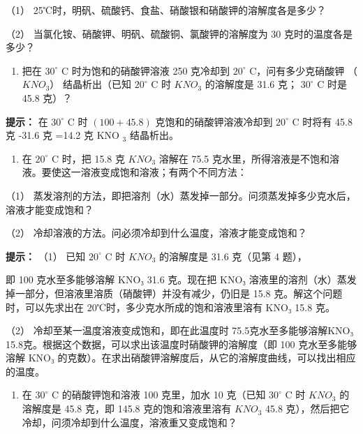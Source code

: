 （1） 25℃时，明矾、硫酸钙、食盐、硝酸银和硝酸钾的溶解度各是多少？

（2） 当氯化铵、硝酸钾、明矾、硫酸铜、氯酸钾的溶解度为 30
克时的温度各是多少？

\begin{enumerate}[start=4]
\item
  把在 \(30^{\circ}\) C 时为饱和的硝酸钾溶液 250 克冷却到 \(20^{\circ}\)
  C，问有多少克硝酸钾 （\(KNO_{3}\)） 结晶析出（已知 \(20^{\circ}\) C 时
  \(KNO_{3}\) 的溶解度是 31.6 克； \(30^{\circ}\) C 时是 45.8 克）？
\end{enumerate}

\begin{shulihuadef}
\textbf{提示：} 在 \(30^{\circ}\) C 时 \((100 + 45.8)\)
克饱和的硝酸钾溶液冷却到 \(20^{\circ}\) C 时将有 45.8 克 -31.6 克 =14.2
克 KNO \(_{3}\) 结晶析出。
\end{shulihuadef}

\begin{enumerate}[start=5]
\item
  在 \(20^{\circ}\) C 时，把 15.8 克 \(KNO_{3}\) 溶解在 75.5
  克水里，所得溶液是不饱和溶液。要使这一溶液变成饱和溶液；有两个不同方法：
\end{enumerate}

（1）
蒸发溶剂的方法，即把溶剂（水）蒸发掉一部分。问须蒸发掉多少克水后，溶液才能变成饱和？

（2） 冷却溶液的方法。问必须冷却到什么温度，溶液才能变成饱和？

\begin{shulihuadef}
\textbf{提示：} （1） 已知 \(20^{\circ}\) C 时 \(KNO_{3}\) 的溶解度是
31.6 克（见第 4 题），
\end{shulihuadef}

即 100 克水至多能够溶解 KNO₃ 31.6 克。现在把 KNO₃
溶液里的溶剂（水）蒸发掉一部分，但溶液里溶质（硝酸钾）并没有减少，仍旧是
15.8 克。解这个问题时，可以先求出在 20℃时，多少克水所成的饱和溶液里溶有
KNO₃ 15.8 克。

（2） 冷却至某一温度溶液变成饱和，即在此温度时 75.5克水至多能够溶解KNO₃
15.8克。根据这个数据，可以求出该温度时硝酸钾的溶解度（即 100
克水至多能够溶解 KNO₃
的克数）。在求出硝酸钾溶解度后，从它的溶解度曲线，可以找出相应的温度。

\begin{enumerate}[start=6]
\item
  在 \(30^{\circ}\) C 的硝酸钾饱和溶液 100 克里，加水 10 克（已知
  \(30^{\circ}\) C 时 \(KNO_{3}\) 的溶解度是 45.8 克，即 145.8
  克的饱和溶液里溶有 \(KNO_{3}\) 45.8
  克），然后把它冷却，问须冷却到什么温度，溶液重又变成饱和？
\end{enumerate}

